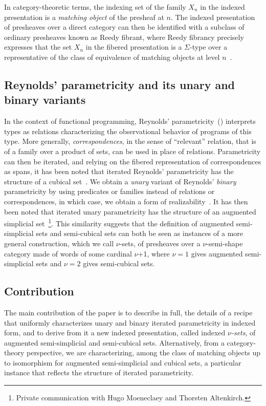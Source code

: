 \documentclass{msc}
\begin{document}
In category-theoretic terms, the indexing set of the family $X_n$ in the indexed presentation is a \emph{matching object} of the presheaf at $n$. The indexed presentation of presheaves over a direct category can then be identified with a subclass of ordinary presheaves known as Reedy fibrant, where Reedy fibrancy precisely expresses that the set $X_n$ in the fibered presentation is a $\Sigma$-type over a representative of the class of equivalence of matching objects at level $n$~\citep{shulman14,kraus17}.

\subsection*{Reynolds' parametricity and its unary and binary variants}
In the context of functional programming, Reynolds' parametricity~(\citeyear{reynolds83}) interprets types as relations characterizing the observational behavior of programs of this type. More generally, \emph{correspondences}, in the sense of ``relevant'' relation, that is of a family over a product of sets, can be used in place of relations. Parametricity can then be iterated, and relying on the fibered representation of correspondences as spans, it has been noted that iterated Reynolds' parametricity has the structure of a cubical set~\citep{johann17,altenkirch15,moulin16,moeneclaey21,moeneclaey22phd}. We obtain a \emph{unary} variant of Reynolds' \emph{binary} parametricity by using predicates or families instead of relations or correspondences, in which case, we obtain a form of realizability~\citep{bernardy12,lasson12,moulin16}. It has then been noted that iterated unary parametricity has the structure of an augmented simplicial set~\footnote{Private communication with Hugo Moeneclaey and Thorsten Altenkirch.}. This similarity suggests that the definition of augmented semi-simplicial sets and semi-cubical sets can both be seen as instances of a more general construction, which we call $\nu$-sets, of presheaves over a $\nu$-semi-shape category made of words of some cardinal $\nu$+1, where $\nu=1$ gives augmented semi-simplicial sets and $\nu=2$ gives semi-cubical sets.

\subsection*{Contribution}
The main contribution of the paper is to describe in full, the details of a recipe that uniformly characterizes unary and binary iterated parametricity in indexed form, and to derive from it a new indexed presentation, called indexed \emph{$\nu$-sets}, of augmented semi-simplicial and semi-cubical sets. Alternatively, from a category-theory perspective, we are characterizing, among the class of matching objects up to isomorphism for augmented semi-simplicial and cubical sets, a particular instance that reflects the structure of iterated parametricity.
\end{document}
